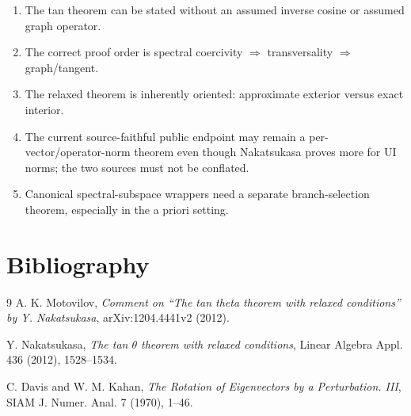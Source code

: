 \begin{enumerate}[leftmargin=2em]
\item The tan theorem can be stated without an assumed inverse cosine or assumed graph operator.
\item The correct proof order is spectral coercivity $\Rightarrow$ transversality $\Rightarrow$ graph/tangent.
\item The relaxed theorem is inherently oriented: approximate exterior versus exact interior.
\item The current source-faithful public endpoint may remain a per-vector/operator-norm theorem even though Nakatsukasa proves more for UI norms; the two sources must not be conflated.
\item Canonical spectral-subspace wrappers need a separate branch-selection theorem, especially in the a priori setting.
\end{enumerate}

\section*{Bibliography}
\begin{thebibliography}{9}
A. K. Motovilov,
\emph{Comment on ``The tan theta theorem with relaxed conditions'' by Y. Nakatsukasa},
arXiv:1204.4441v2 (2012).

Y. Nakatsukasa,
\emph{The tan $\theta$ theorem with relaxed conditions},
Linear Algebra Appl. 436 (2012), 1528--1534.

C. Davis and W. M. Kahan,
\emph{The Rotation of Eigenvectors by a Perturbation. III},
SIAM J. Numer. Anal. 7 (1970), 1--46.
\end{thebibliography}


